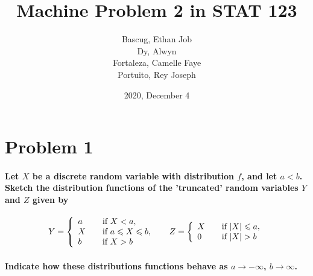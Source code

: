 \documentclass[12pt,letterpaper]{article}
\title{\textbf{Machine Problem 2 in STAT 123}}
\date{2020, December 4}
\author{Bascug, Ethan Job \\Dy, Alwyn \\ Fortaleza, Camelle Faye \\Portuito, Rey Joseph}
\begin{document}
    \maketitle

    \section*{Problem 1}
    \paragraph*{Let $X$ be a discrete random variable with distribution $f$, and let $a<b$. Sketch the distribution functions of the 'truncated' random variables $Y$ and $Z$ given by}

    \begin{equation*}
      Y = \left\{
        \begin{array}{ll}
            a & \quad \mbox{if } X < a, \\
            X & \quad \mbox{if } a \leqslant X \leqslant b,\\
            b & \quad \mbox{if } X>b
        \end{array}
      \right. \hspace*{0.5cm}
      Z = \left\{
        \begin{array}{ll}
            X & \quad \mbox{if } \lvert X \rvert \leqslant a, \\
            0 & \quad \mbox{if } \lvert X \rvert  > b
        \end{array}
      \right.
    \end{equation*}
    \paragraph*{Indicate how these distributions functions behave as $a\rightarrow -\infty$, $b \rightarrow \infty$.}
\end{document}
